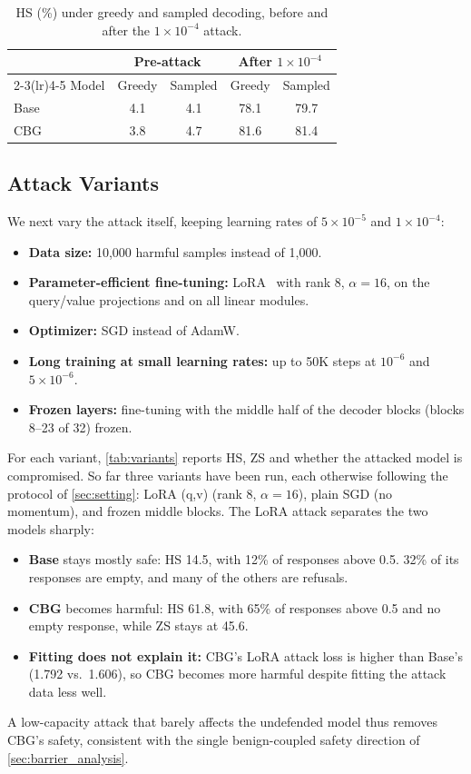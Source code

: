 \documentclass[11pt]{article}
\begin{document}
\begin{table}[t]
\centering
\small
\caption{HS (\%) under greedy and sampled decoding, before and after the $1\times10^{-4}$ attack.}
\label{tab:decoding}
\begin{tabular}{lcccc}
\toprule
& \multicolumn{2}{c}{Pre-attack} & \multicolumn{2}{c}{After $1\times10^{-4}$}\\
\cmidrule(lr){2-3}\cmidrule(lr){4-5}
Model & Greedy & Sampled & Greedy & Sampled\\
\midrule
Base & 4.1 & 4.1 & 78.1 & 79.7\\
CBG  & 3.8 & 4.7 & 81.6 & 81.4\\
\bottomrule
\end{tabular}
\end{table}



\subsection{Attack Variants}
\label{sec:exp_variants}

We next vary the attack itself, keeping learning rates of $5\times10^{-5}$ and $1\times10^{-4}$:
\begin{itemize}
  \item \textbf{Data size:} 10{,}000 harmful samples instead of 1{,}000.
  \item \textbf{Parameter-efficient fine-tuning:} LoRA~\citep{hu2022lora} with rank 8, $\alpha=16$, on the query/value projections and on all linear modules.
  \item \textbf{Optimizer:} SGD instead of AdamW.
  \item \textbf{Long training at small learning rates:} up to 50K steps at $10^{-6}$ and $5\times10^{-6}$.
  \item \textbf{Frozen layers:} fine-tuning with the middle half of the decoder blocks (blocks 8--23 of 32) frozen.
\end{itemize}
For each variant, \cref{tab:variants} reports HS, ZS and whether the attacked model is compromised. So far three variants have been run, each otherwise following the protocol of \cref{sec:setting}: LoRA (q,v) (rank 8, $\alpha=16$), plain SGD (no momentum), and frozen middle blocks. The LoRA attack separates the two models sharply:
\begin{itemize}
  \item \textbf{Base} stays mostly safe: HS 14.5, with 12\% of responses above 0.5. 32\% of its responses are empty, and many of the others are refusals.
  \item \textbf{CBG} becomes harmful: HS 61.8, with 65\% of responses above 0.5 and no empty response, while ZS stays at 45.6.
  \item \textbf{Fitting does not explain it:} CBG's LoRA attack loss is higher than Base's (1.792 vs.\ 1.606), so CBG becomes more harmful despite fitting the attack data less well.
\end{itemize}
A low-capacity attack that barely affects the undefended model thus removes CBG's safety, consistent with the single benign-coupled safety direction of \cref{sec:barrier_analysis}.
\end{document}
